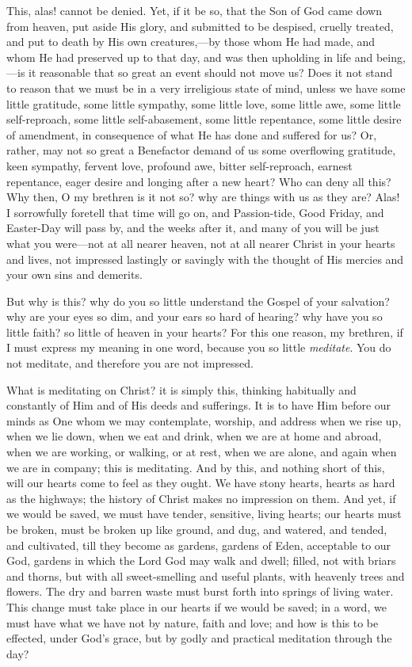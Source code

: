 This, alas! cannot be denied. Yet, if it be so, that the Son of God
came down from heaven, put aside His glory, and submitted to be
despised, cruelly treated, and put to death by His own creatures,—by
those whom He had made, and whom He had preserved up to that day, and
was then upholding in life and being,—is it reasonable that so great
an event should not move us? Does it not stand to reason that we must be
in a very irreligious state of mind, unless we have some little
gratitude, some little sympathy, some little love, some little awe, some
little self-reproach, some little self-abasement, some little
repentance, some little desire of amendment, in consequence of what He
has done and suffered for us? Or, rather, may not so great a Benefactor
demand of us some overflowing gratitude, keen sympathy, fervent love,
profound awe, bitter self-reproach, earnest repentance, eager desire and
longing after a new heart? Who can deny all this? Why then, O my
brethren is it not so? why are things with us as they are? Alas! I
sorrowfully foretell that time will go on, and Passion-tide, Good
Friday, and Easter-Day will pass by, and the weeks after it, and many of
you will be just what you were—not at all nearer heaven, not at all
nearer Christ in your hearts and lives, not impressed lastingly or
savingly with the thought of His mercies and your own sins and demerits.

But why is this? why do you so little understand the Gospel of your
salvation? why are your eyes so dim, and your ears so hard of hearing?
why have you so little faith? so little of heaven in your hearts? For
this one reason, my brethren, if I must express my meaning in one word,
because you so little \emph{meditate}. You do not meditate, and
therefore you are not impressed.

What is meditating on Christ? it is simply this, thinking habitually
and constantly of Him and of His deeds and sufferings. It is to have Him
before our minds as One whom we may contemplate, worship, and address
when we rise up, when we lie down, when we eat and drink, when we are at
home and abroad, when we are working, or walking, or at rest, when we
are alone, and again when we are in company; this is meditating. And by
this, and nothing short of this, will our hearts come to feel as they
ought. We have stony hearts, hearts as hard as the highways; the history
of Christ makes no impression on them. And yet, if we would be saved, we
must have tender, sensitive, living hearts; our hearts must be broken,
must be broken up like ground, and dug, and watered, and tended, and
cultivated, till they become as gardens, gardens of Eden, acceptable to
our God, gardens in which the Lord God may walk and dwell; filled, not
with briars and thorns, but with all sweet-smelling and useful plants,
with heavenly trees and flowers. The dry and barren waste must burst
forth into springs of living water. This change must take place in our
hearts if we would be saved; in a word, we must have what we have not by
nature, faith and love; and how is this to be effected, under God's
grace, but by godly and practical meditation through the day?

